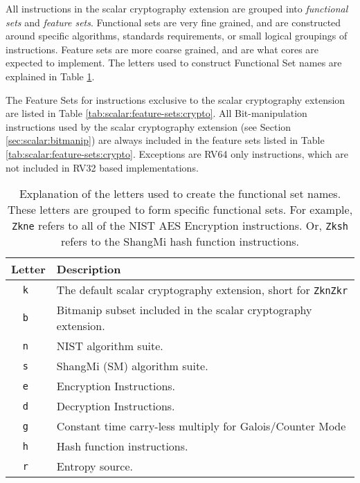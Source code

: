 
All instructions in the scalar cryptography extension are grouped into
{\em functional sets} and {\em feature sets}.
Functional sets are very fine grained, and are constructed around
specific algorithms, standards requirements, or small logical groupings
of instructions.
Feature sets are more coarse grained, and are what cores are expected
to implement.
The letters used to construct Functional Set names are explained in
Table \ref{tab:scalar:functional-sets}.

The Feature Sets for instructions exclusive to the scalar cryptography
extension are listed in
Table \ref{tab:scalar:feature-sets:crypto}.
All Bit-manipulation instructions used by the scalar cryptography extension
(see Section \ref{sec:scalar:bitmanip})
are always included in the feature sets listed in
Table \ref{tab:scalar:feature-sets:crypto}.
Exceptions are RV64 only instructions, which are not included in RV32
based implementations.

\begin{table}[h]
\centering
\begin{tabular}{cl}
Letter   & Description \\
\hline
{\tt k } & The default scalar cryptography extension, short for {\tt ZknZkr}    \\
{\tt b } & Bitmanip subset included in the scalar cryptography extension.       \\
{\tt n } & NIST algorithm suite.                                                \\
{\tt s } & ShangMi (SM) algorithm suite.                                        \\
{\tt e } & Encryption Instructions.                                             \\
{\tt d } & Decryption Instructions.                                             \\
{\tt g } & Constant time carry-less multiply for Galois/Counter Mode            \\
{\tt h } & Hash function instructions.                                          \\
{\tt r } & Entropy source.                                                      \\
\hline
\end{tabular}
\caption{
    Explanation of the letters used to create the functional set names.
    These letters are grouped to form specific functional sets.
    For example, {\tt Zkne} refers to all of the NIST AES Encryption
    instructions. Or, {\tt Zksh} refers to the ShangMi hash function instructions.
}
\label{tab:scalar:functional-sets}
\end{table}

